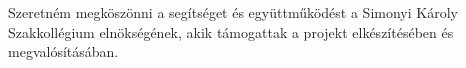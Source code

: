 \chapter*{\koszonetnyilvanitas}

Szeretném megköszönni a segítséget és együttműködést a Simonyi Károly Szakkollégium elnökségének, akik támogattak a
projekt elkészítésében és megvalósításában.
